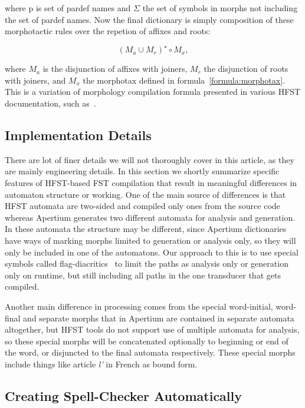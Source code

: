 \documentclass[10pt,a4paper]{article}
\begin{document}
where p is set of pardef names and $\Sigma$ the set
of symbols in morphs not including the set of pardef names.  Now the final
dictionary is simply composition of these morphotactic rules over the repetion
of affixes and roots:

\begin{equation}\label{formula:lexical}
(M_a \cup M_r)^{\star} \circ M_x,
\end{equation}

where $M_{a}$ is the disjunction of affixes with joiners, $M_{r}$ the
disjunction of roots with joiners, and $M_x$ the morphotax defined in
formula~\ref{formula:morphotax}. This is a variation of morphology compilation
formula presented in various HFST documentation, such as~\cite{hfst/2011}.

\subsection{Implementation Details}

There are lot of finer details we will not thoroughly cover in this article, as
they are mainly engineering details. In this section we shortly summarize
specific features of HFST-based FST compilation that result in meaningful
differences in automaton structure or working. One of the main source of
differences is that HFST automata are two-sided and compiled only ones from the
source code whereas Apertium generates two different automata for analysis and
generation. In these automata the structure may be different, since Apertium
dictionaries have ways of marking morphs limited to generation or analysis
only, so they will only be included in one of the automatons. Our approach to
this is to use special symbols called flag-diacritics~\cite{beesley/2004} to
limit the paths as analysis only or generation only on runtime, but still
including all paths in the one transducer that gets compiled.

Another main difference in processing comes from the special word-initial, 
word-final and separate morphs that in Apertium are contained in separate
automata altogether, but HFST tools do not support use of multiple automata
for analysis, so these special morphs will be concatenated optionally to
beginning or end of the word, or disjuncted to the final automata respectively.
These special morphs include things like article \emph{l'} in French as bound
form.

\subsection{Creating Spell-Checker Automatically}
\end{document}
